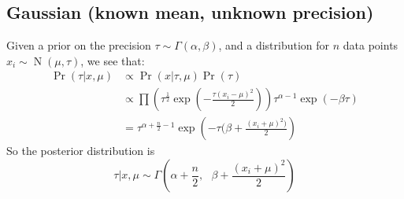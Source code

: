 \documentclass[12pt]{report}
\DeclareMathOperator{\N}{N}
\begin{document}
\subsection*{Gaussian (known mean, unknown precision)}
\label{sec:conj:gaussianwithmean}

Given a prior on the precision $\tau \sim \Gamma(\alpha, \beta)$, and a distribution for $n$ data points $x_i \sim \N(\mu, \tau)$, we see that: \begin{align*}
\Pr(\tau | x, \mu) &\propto \Pr(x | \tau, \mu)\Pr(\tau) \\
&\propto \prod\left(\tau^{\frac{1}{2}}\exp\left(  -\frac{\tau(x_i - \mu)^2}{2}  \right)\right) \tau^{\alpha-1}\exp(-\beta\tau) \\
&= \tau^{\alpha + \frac{n}{2} - 1}\exp\left(  -\tau(\beta + \frac{(x_i + \mu)^2)}{2}  \right)
\end{align*}
So the posterior distribution is \[
\tau | x, \mu \sim \Gamma\left(  \alpha + \frac{n}{2}, \text{ } \beta + \frac{(x_i + \mu)^2}{2}  \right)
\]

\nocite{*}

\end{document}
